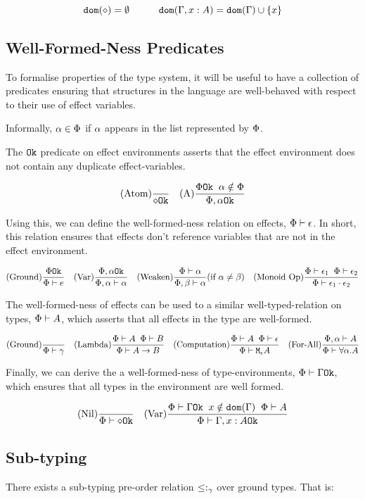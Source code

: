 \documentclass{Report}
\begin{document}
\[
    \dom{\nil} = \emptyset
    \quad\quad\quad
    \dom{\gax} =  \dom{\G}  \cup \left\{x \right\}
\]

\subsection{Well-Formed-Ness Predicates}
To formalise properties of the type system, it will be useful to have a collection of predicates ensuring that structures in the language are well-behaved with respect to their use of effect variables.

Informally, $\a \in \P$ if $\a$ appears in the list represented by $\P$.

The $\ok{}$ predicate on effect environments asserts that the effect environment does not contain any duplicate effect-variables.

\[
    \treerule{Atom}{}{\ok{\nil}}
\quad
    \treerule{A}{\ok{\P} \s\s \a\notin \P}{\ok{\P, \a}}
\]

Using this, we can define the well-formed-ness relation on effects, $\wellformed{\P}{\e}$. In short, this relation ensures that effects don't reference variables that are not in the effect environment.

\[
    \treerule{Ground}{\ok{\P}}{\wellformed{\P}{e}}
    \quad
    \treerule{Var}{\ok{\P,\a}}{\wellformed{\P,\a}{\a}}
    \quad
    \condtreerule{Weaken}{\wellformed{\P}{\a}}{\wellformed{\P,\b}{\a}}{\a\neq\b}
    \quad
    \treerule{Monoid Op}{\wellformed{\P}{\e_1}\s\s\wellformed{\P}{\e_2}}{\wellformed{\P}{\e_1\dot\e_2}}
\]

The well-formed-ness of effects can be used to a similar well-typed-relation on types, $\wellformed{\P}{A}$, which asserts that all effects in the type are well-formed.

\[
    \treerule{Ground}{}{\wellformed{\P}{\g}}
    \quad
    \treerule{Lambda}{\wellformed{\P}{A}\s\s\wellformed{\P}{B}}{\wellformed{\P}{\ab}}
    \quad
    \treerule{Computation}{\wellformed{\P}{A}\s\s\wellformed{\P}{\e}}{\wellformed{\P}{\mea}}
    \quad
    \treerule{For-All}{\wellformed{\P,\a}{A}}{\wellformed{\P}{\all{\a}{A}}}
\]

Finally, we can derive the a well-formed-ness of type-environments,   $\oke{\P}{\G}$, which ensures that all types in the environment are well formed.

\[
    \treerule{Nil}{}{\oke{\P}{\nil}}
    \quad
    \treerule{Var}{\oke{\P}{\G}\s\s x\notin\dom{\G}\s\s \wellformed{\P}{A}}{\oke{\P}{\gax}}
\]

\subsection{Sub-typing}
    There exists a sub-typing pre-order relation $\subtype_{\ground}$ over ground types. That is:
\end{document}
